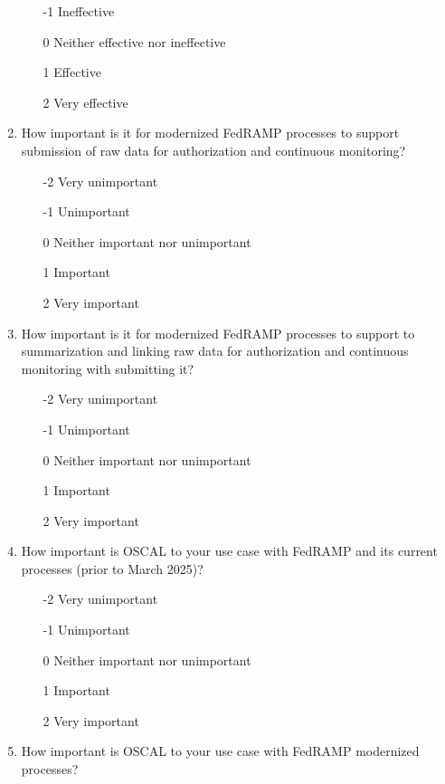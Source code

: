 \documentclass{jdf}
\begin{document}
\begin{enumerate}
\begin{enumerate}
        \item [-1] Ineffective
        \item  [0] Neither effective nor ineffective
        \item  [1] Effective 
        \item  [2] Very effective
    \end{enumerate}
    \item How important is it for modernized FedRAMP processes to support submission of raw data for authorization and continuous monitoring?
    \begin{enumerate}
        \item [-2] Very unimportant
        \item [-1] Unimportant
        \item  [0] Neither important nor unimportant
        \item  [1] Important
        \item  [2] Very important
    \end{enumerate}
    \item How important is it for modernized FedRAMP processes to support to summarization and linking raw data for authorization and continuous monitoring with submitting it?
    \begin{enumerate}
        \item [-2] Very unimportant
        \item [-1] Unimportant
        \item  [0] Neither important nor unimportant
        \item  [1] Important
        \item  [2] Very important
    \end{enumerate}
    \item How important is OSCAL to your use case with FedRAMP and its current processes (prior to March 2025)?
    \begin{enumerate}
        \item [-2] Very unimportant
        \item [-1] Unimportant
        \item  [0] Neither important nor unimportant
        \item  [1] Important
        \item  [2] Very important
    \end{enumerate}
    \item How important is OSCAL to your use case with FedRAMP modernized processes?
    \begin{enumerate}

\end{enumerate}
\end{enumerate}
\end{document}
